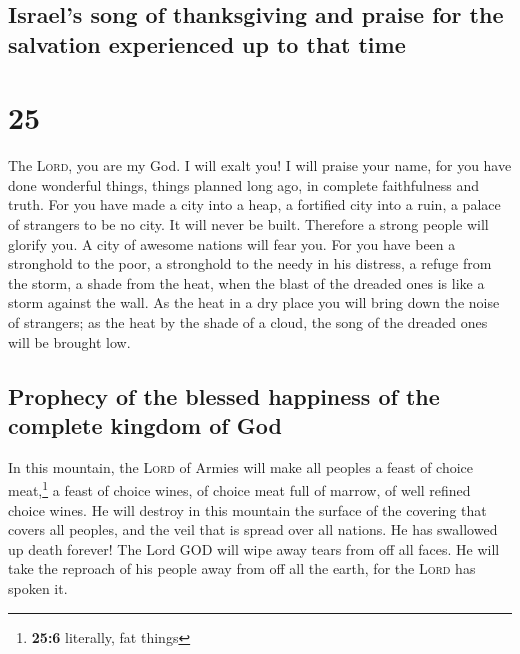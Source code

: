 \hypertarget{israels-song-of-thanksgiving-and-praise-for-the-salvation-experienced-up-to-that-time}{%
\subsection{Israel's song of thanksgiving and praise for the salvation
experienced up to that
time}\label{israels-song-of-thanksgiving-and-praise-for-the-salvation-experienced-up-to-that-time}}

\hypertarget{section-24}{%
\section{25}\label{section-24}}

 The \textsc{Lord}, you are my God. I will exalt you! I
will praise your name, for you have done wonderful things, things
planned long ago, in complete faithfulness and truth.  For
you have made a city into a heap, a fortified city into a ruin, a palace
of strangers to be no city. It will never be built. 
Therefore a strong people will glorify you. A city of awesome nations
will fear you.  For you have been a stronghold to the
poor, a stronghold to the needy in his distress, a refuge from the
storm, a shade from the heat, when the blast of the dreaded ones is like
a storm against the wall.  As the heat in a dry place you
will bring down the noise of strangers; as the heat by the shade of a
cloud, the song of the dreaded ones will be brought low.

\hypertarget{prophecy-of-the-blessed-happiness-of-the-complete-kingdom-of-god}{%
\subsection{Prophecy of the blessed happiness of the complete kingdom of
God}\label{prophecy-of-the-blessed-happiness-of-the-complete-kingdom-of-god}}

 In this mountain, the \textsc{Lord} of Armies will make
all peoples a feast of choice meat,\footnote{\textbf{25:6} literally,
  fat things} a feast of choice wines, of choice meat full of marrow, of
well refined choice wines.  He will destroy in this
mountain the surface of the covering that covers all peoples, and the
veil that is spread over all nations.  He has swallowed up
death forever! The Lord GOD will wipe away tears from off all faces. He
will take the reproach of his people away from off all the earth, for
the \textsc{Lord} has spoken it.

